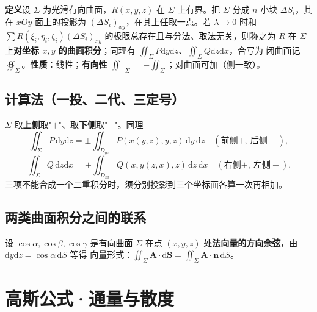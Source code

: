 \textbf{定义}\quad 设 $\Sigma$ 为光滑有向曲面，$R(x,y,z)$ 在 $\Sigma$ 上有界。把 $\Sigma$ 分成 $n$ 小块 $\Delta S_i$，其在 $xOy$ 面上的投影为 $(\Delta S_i)_{xy}$，在其上任取一点。若 $\lambda\to0$ 时和 $\sum R(\xi_i,\eta_i,\zeta_i)(\Delta S_i)_{xy}$ 的极限总存在且与分法、取法无关，则称之为 $R$ 在 $\Sigma$ 上\textbf{对坐标 $x,y$ 的曲面积分}；同理有 $\iint_\Sigma P\mathrm{d}y\mathrm{d}z$、$\iint_\Sigma Q\mathrm{d}z\mathrm{d}x$，合写为
闭曲面记 $\oiint_\Sigma$。\textbf{性质}：线性；\textbf{有向性} $\iint_{-\Sigma}=-\iint_\Sigma$；对曲面可加（侧一致）。

\subsection{计算法（一投、二代、三定号）}

$\Sigma$ 取\textbf{上侧}取"$+$"、取\textbf{下侧}取"$-$"。同理
\[
\iint_\Sigma P\,\mathrm{d}y\mathrm{d}z=\pm\iint_{D_{yz}}P(x(y,z),y,z)\,\mathrm{d}y\,\mathrm{d}z\quad(\text{前侧}+,\ \text{后侧}-),
\]
\[
\iint_\Sigma Q\,\mathrm{d}z\mathrm{d}x=\pm\iint_{D_{zx}}Q(x,y(z,x),z)\,\mathrm{d}z\,\mathrm{d}x\quad(\text{右侧}+,\ \text{左侧}-).
\]
三项不能合成一个二重积分时，须分别投影到三个坐标面各算一次再相加。


\subsection{两类曲面积分之间的联系}

设 $\cos\alpha,\cos\beta,\cos\gamma$ 是有向曲面 $\Sigma$ 在点 $(x,y,z)$ 处\textbf{法向量的方向余弦}，由 $\mathrm{d}y\mathrm{d}z=\cos\alpha\,\mathrm{d}S$ 等得
向量形式：$\iint_\Sigma\boldsymbol A\cdot\mathrm{d}\boldsymbol S=\iint_\Sigma\boldsymbol A\cdot\boldsymbol n\,\mathrm{d}S$。

\section{高斯公式·通量与散度}
